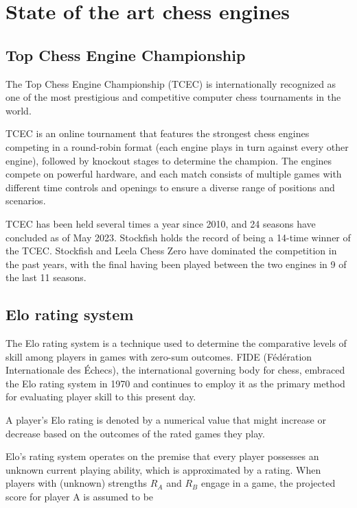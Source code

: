 \chapter{State of the art chess engines}
\label{chap:ch3}

\section{Top Chess Engine Championship}
\label{sec:ch3sec1}

The Top Chess Engine Championship (TCEC) is internationally recognized as one of the most prestigious and competitive computer chess tournaments in the world.

TCEC is an online tournament that features the strongest chess engines competing in a round-robin format (each engine plays in turn against every other engine), followed by knockout stages to determine the champion. The engines compete on powerful hardware, and each match consists of multiple games with different time controls and openings to ensure a diverse range of positions and scenarios.

TCEC has been held several times a year since 2010, and 24 seasons have concluded as of May 2023. Stockfish holds the record of being a 14-time winner of the TCEC. Stockfish and Leela Chess Zero have dominated the competition in the past years, with the final having been played between the two engines in 9 of the last 11 seasons.

\section{Elo rating system}
\label{sec:ch3sec2}

The Elo rating system is a technique used to determine the comparative levels of skill among players in games with zero-sum outcomes. FIDE (Fédération Internationale des Échecs), the international governing body for chess, embraced the Elo rating system in 1970 and continues to employ it as the primary method for evaluating player skill to this present day.

A player's Elo rating is denoted by a numerical value that might increase or decrease based on the outcomes of the rated games they play.

Elo's rating system operates on the premise that every player possesses an unknown current playing ability, which is approximated by a rating. When players with (unknown) strengths $R_A$ and $R_B$ engage in a game, the projected score for player A is assumed to be


